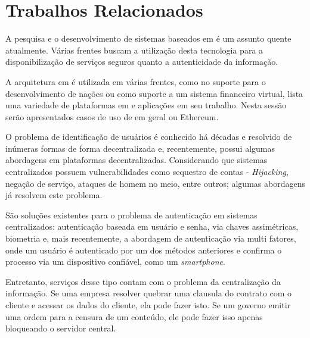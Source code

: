\documentclass[tcc,capa]{texufpel}
\begin{document}



\chapter{Trabalhos Relacionados}\label{ssc:trabalhos-relacionados}
    
    A pesquisa e o desenvolvimento de sistemas baseados em \bchain é um assunto quente atualmente. Várias frentes buscam a utilização desta tecnologia para a disponibilização de serviços seguros quanto a autenticidade da informação.
    
    A arquitetura em \bchain é utilizada em várias frentes, como no suporte para o desenvolvimento de nações ou como suporte a um sistema financeiro virtual, \cite{gomez2017creating} lista uma variedade de plataformas em \bchain e aplicações em seu trabalho. Nesta sessão serão apresentados casos de uso de \bchain em geral ou Ethereum.
    
    O problema de identificação de usuários é conhecido há décadas e resolvido de inúmeras formas de forma decentralizada e, recentemente, possui algumas abordagens em plataformas decentralizadas. Considerando que sistemas centralizados possuem vulnerabilidades como sequestro de contas - \textit{Hijacking}, negação de serviço, ataques de homem no meio, entre outros; algumas abordagens já resolvem este problema.
    
    São soluções existentes para o problema de autenticação em sistemas centralizados: autenticação baseada em usuário e senha, via chaves assimétricas, biometria e, mais recentemente, a abordagem de autenticação via multi fatores, onde um usuário é autenticado por um dos métodos anteriores e confirma o processo via um dispositivo confiável, como um \textit{smartphone}.
    
    Entretanto, serviços desse tipo contam com o problema da centralização da informação. Se uma empresa resolver quebrar uma clausula do contrato com o cliente e acessar os dados do cliente, ela pode fazer isto. Se um governo emitir uma ordem para a censura de um conteúdo, ele pode fazer isso apenas bloqueando o servidor central.
    
\end{document}
